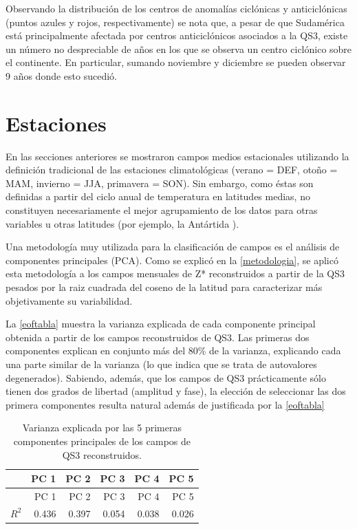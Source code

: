 \documentclass[spanish,a4paper,12pt,oneside]{book}
\begin{document}
Observando la distribución de los centros de anomalías ciclónicas y
anticiclónicas (puntos azules y rojos, respectivamente) se nota que, a
pesar de que Sudamérica está principalmente afectada por centros
anticiclónicos asociados a la QS3, existe un número no despreciable de
años en los que se observa un centro ciclónico sobre el continente. En
particular, sumando noviembre y diciembre se pueden observar 9 años
donde esto sucedió.

\section{Estaciones}\label{estaciones}

En las secciones anteriores se mostraron campos medios estacionales
utilizando la definición tradicional de las estaciones climatológicas
(verano = DEF, otoño = MAM, invierno = JJA, primavera = SON). Sin
embargo, como éstas son definidas a partir del ciclo anual de
temperatura en latitudes medias, no constituyen necesariamente el mejor
agrupamiento de los datos para otras variables u otras latitudes (por
ejemplo, la Antártida \autocite{King1997}).

Una metodología muy utilizada para la clasificación de campos es el
análisis de componentes principales (PCA). Como se explicó en la
\autoref{metodologia}, se aplicó esta metodología a los campos mensuales
de Z* reconstruidos a partir de la QS3 pesados por la raiz cuadrada del
coseno de la latitud para caracterizar más objetivamente su
variabilidad.

La \autoref{eoftabla} muestra la varianza explicada de cada componente
principal obtenida a partir de los campos reconstruidos de QS3. Las
primeras dos componentes explican en conjunto más del 80\% de la
varianza, explicando cada una parte similar de la varianza (lo que
indica que se trata de autovalores degenerados). Sabiendo, además, que
los campos de QS3 prácticamente sólo tienen dos grados de libertad
(amplitud y fase), la elección de seleccionar las dos primera
componentes resulta natural además de justificada por la
\autoref{eoftabla}

\begin{longtable}[]{@{}lrrrrr@{}}
\caption{Varianza explicada por las 5 primeras componentes principales
de los campos de QS3 reconstruidos.\label{eoftabla}}\tabularnewline
\toprule
& PC 1 & PC 2 & PC 3 & PC 4 & PC 5\tabularnewline
\midrule
\endfirsthead
\toprule
& PC 1 & PC 2 & PC 3 & PC 4 & PC 5\tabularnewline
\midrule
\endhead
\(R^2\) & 0.436 & 0.397 & 0.054 & 0.038 & 0.026\tabularnewline
\bottomrule
\end{longtable}
\end{document}
